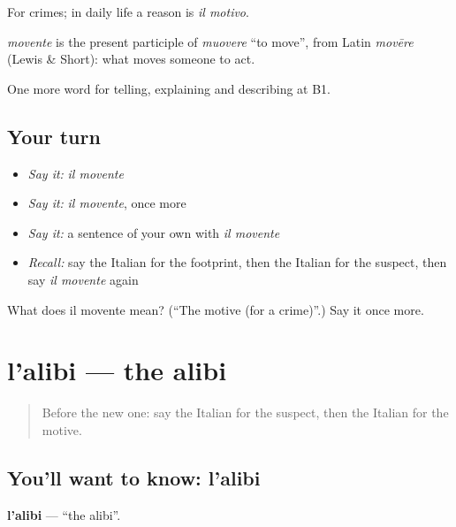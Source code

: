For crimes; in daily life a reason is \emph{il motivo}.

\begin{cousinweb}
\emph{movente} is the present participle of \emph{muovere} \textquotedblleft{}to move\textquotedblright{}, from Latin \emph{movēre} (Lewis \& Short): what moves someone to act.
\end{cousinweb}

\begin{grammarlens}[title={What you've built}]
One more word for telling, explaining and describing at B1.
\end{grammarlens}

\subsection*{Your turn}
\begin{itemize}
\raggedright
  \item \emph{Say it:} \emph{il movente}
  \item \emph{Say it:} \emph{il movente}, once more
  \item \emph{Say it:} a sentence of your own with \emph{il movente}
  \item \emph{Recall:} say the Italian for the footprint, then the Italian for the suspect, then say \emph{il movente} again
\end{itemize}

\begin{tcolorbox}[breakable,colback=teal!4,colframe=teal!35!black,title={Before you move on}]
What does il movente mean? (\textquotedblleft{}The motive (for a crime)\textquotedblright{}.) Say it once more.
\end{tcolorbox}
\section[l'alibi]{l'alibi — the alibi}

\label{lesson:IT-C296-alibi}



\begin{quote}
Before the new one: say the Italian for the suspect, then the Italian for the motive.
\end{quote}

\subsection*{You'll want to know: l'alibi}
\textbf{l'alibi} — \textquotedblleft{}the alibi\textquotedblright{}.

